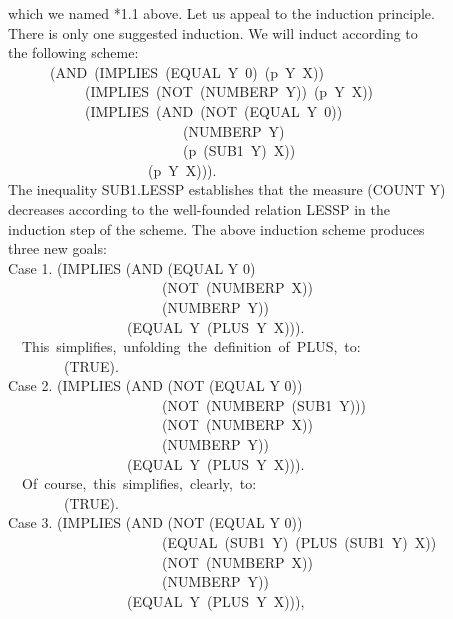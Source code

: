 \documentclass[10pt]{book}
\newenvironment{pubasis}{\begin{flushleft}}{\end{flushleft}}
\begin{document}
\begin{pubasis}
which we named *1.1 above.  Let us appeal to the induction principle.\\
There is only one suggested induction.  We will induct according to\\
the following scheme:\\
~~~~~~(AND~(IMPLIES~(EQUAL~Y~0)~(p~Y~X))\\
~~~~~~~~~~~(IMPLIES~(NOT~(NUMBERP~Y))~(p~Y~X))\\
~~~~~~~~~~~(IMPLIES~(AND~(NOT~(EQUAL~Y~0))\\
~~~~~~~~~~~~~~~~~~~~~~~~~(NUMBERP~Y)\\
~~~~~~~~~~~~~~~~~~~~~~~~~(p~(SUB1~Y)~X))\\
~~~~~~~~~~~~~~~~~~~~(p~Y~X))).\\
The inequality SUB1.LESSP establishes that the measure (COUNT Y)\\
decreases according to the well-founded relation LESSP in the\\
induction step of the scheme.  The above induction scheme produces\\
three new goals:\\

Case 1.	(IMPLIES (AND (EQUAL Y 0)\\
~~~~~~~~~~~~~~~~~~~~~~(NOT~(NUMBERP~X))\\
~~~~~~~~~~~~~~~~~~~~~~(NUMBERP~Y))\\
~~~~~~~~~~~~~~~~~(EQUAL~Y~(PLUS~Y~X))).\\

~~This~simplifies,~unfolding~the~definition~of~PLUS,~to:\\

~~~~~~~~(TRUE).\\

Case 2.	(IMPLIES (AND (NOT (EQUAL Y 0))\\
~~~~~~~~~~~~~~~~~~~~~~(NOT~(NUMBERP~(SUB1~Y)))\\
~~~~~~~~~~~~~~~~~~~~~~(NOT~(NUMBERP~X))\\
~~~~~~~~~~~~~~~~~~~~~~(NUMBERP~Y))\\
~~~~~~~~~~~~~~~~~(EQUAL~Y~(PLUS~Y~X))).\\

~~Of~course,~this~simplifies,~clearly,~to:\\

~~~~~~~~(TRUE).\\

Case 3.	(IMPLIES (AND (NOT (EQUAL Y 0))\\
~~~~~~~~~~~~~~~~~~~~~~(EQUAL~(SUB1~Y)~(PLUS~(SUB1~Y)~X))\\
~~~~~~~~~~~~~~~~~~~~~~(NOT~(NUMBERP~X))\\
~~~~~~~~~~~~~~~~~~~~~~(NUMBERP~Y))\\
~~~~~~~~~~~~~~~~~(EQUAL~Y~(PLUS~Y~X))),\\


\end{pubasis}
\end{document}

